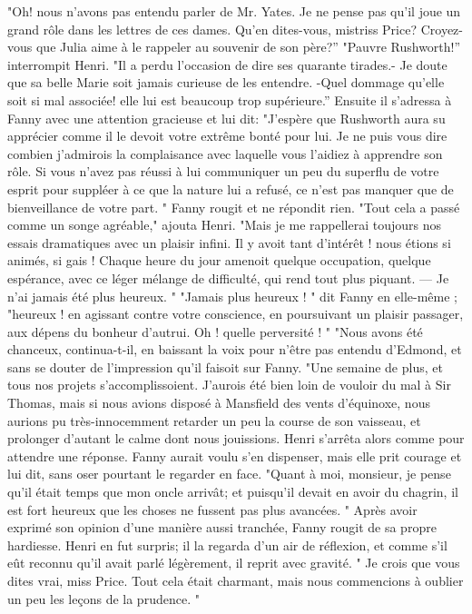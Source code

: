 "Oh! nous n'avons pas entendu parler de Mr. Yates. Je ne pense pas qu'il joue un grand rôle dans les lettres de ces dames. Qu'en dites-vous, mistriss Price? Croyez-vous que Julia aime à le rappeler au souvenir de son père?''
"Pauvre Rushworth!'' interrompit Henri. "Il a perdu l'occasion de dire ses quarante tirades.- Je doute que sa belle Marie soit jamais curieuse de les entendre. -Quel dommage qu'elle soit si mal associée! elle lui est beaucoup trop supérieure.'' Ensuite il s'adressa à Fanny avec une attention gracieuse et lui dit: "J'espère que Rushworth aura su apprécier comme il le devoit votre extrême bonté pour lui. Je ne puis vous dire combien j'admirois la complaisance avec laquelle vous l'aidiez à apprendre son rôle. Si vous n'avez pas réussi à lui communiquer un peu du superflu de votre esprit pour suppléer à ce que la nature lui a refusé, ce n'est pas manquer\setcounter{page}{246} que de bienveillance de votre part. "
Fanny rougit et ne répondit rien.
"Tout cela a passé comme un songe agréable," ajouta Henri. "Mais je me rappellerai toujours nos essais dramatiques avec un plaisir infini. Il y avoit tant d’intérêt ! nous étions si animés, si gais ! Chaque heure du jour amenoit quelque occupation, quelque espérance, avec ce léger mélange de difficulté, qui rend tout plus piquant. — Je n’ai jamais été plus heureux. "
"Jamais plus heureux ! " dit Fanny en elle-même ; "heureux ! en agissant contre votre conscience, en poursuivant un plaisir passager, aux dépens du bonheur d’autrui. Oh ! quelle perversité ! "
"Nous avons été chanceux, continua-t-il, en baissant la voix pour n’être pas entendu d’Edmond, et sans se douter de l’impression qu’il faisoit sur Fanny. "Une semaine de plus, et tous nos projets s’accomplissoient. J’aurois été bien loin de vouloir du mal à Sir Thomas, mais si nous avions disposé à Mansfield des vents d’équinoxe, nous aurions pu très-innocemment retarder un peu la course de son vaisseau, et prolonger d’autant le calme dont nous jouissions.
Henri s’arrêta alors comme pour attendre\setcounter{page}{247} une réponse. Fanny aurait voulu s'en dispenser, mais elle prit courage et lui dit, sans oser pourtant le regarder en face. "Quant à moi, monsieur, je pense qu'il était temps que mon oncle arrivât; et puisqu'il devait en avoir du chagrin, il est fort heureux que les choses ne fussent pas plus avancées. "
Après avoir exprimé son opinion d'une manière aussi tranchée, Fanny rougit de sa propre hardiesse. Henri en fut surpris; il la regarda d'un air de réflexion, et comme s'il eût reconnu qu'il avait parlé légèrement, il reprit avec gravité. " Je crois que vous dites vrai, miss Price. Tout cela était charmant, mais nous commencions à oublier un peu les leçons de la prudence. "
